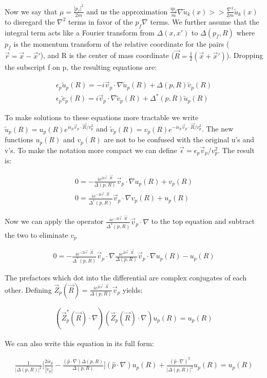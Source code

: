 \documentclass{article}
\begin{document}
Now we say that $\mu=\frac{|p_f|^2}{2m}$ and us the approximation $\frac{ip_f}{m}\nabla\tilde{u}_k(x)>>\frac{\nabla^2}{2m}\tilde{u}_k(x)$ to disregard the $\nabla^2$ terms in favor of the $p_f\nabla$ terms. We further assume that the integral term acts like a Fourier transform from $\Delta(x,x')$ to $\Delta(p_f,R)$ where $p_f$ is the momentum transform of the relative coordinate for the pairs ($\vec{r}=\vec{x}-\vec{x}'$), and R is the center of mass coordinate ($\vec{R}=\frac{1}{2}(\vec{x}+\vec{x}')$). Dropping the subscript f on p, the resulting equations are:

\begin{align*}
\epsilon_p\tilde{u}_p(R)=-i\vec{v}_p\cdot\nabla\tilde{u}_p(R)+\Delta(p,R)\tilde{v}_p(R) \\
\epsilon_p\tilde{v}_p(R)=i\vec{v}_p\cdot\nabla\tilde{v}_p(R)+\Delta^*(p,R)\tilde{u}_p(R)
\end{align*}

To make solutions to these equations more tractable we write $\tilde{u}_p(R)=u_p(R) e^{i\epsilon_p\vec{v}_p\cdot\vec{R}/v_p^2}$ and $\tilde{v}_p(R)=v_p(R) e^{-i\epsilon_p\vec{v}_p\cdot\vec{R}/v_p^2}$. The new functions $u_p(R)$ and $v_p(R)$ are not to be confused with the original u's and v's. To make the notation more compact we can define $\vec{\epsilon}=\epsilon_p\vec{v}_p/v_p^2$. The result is:

\begin{align*}
0=-\frac{ie^{2i\vec{\epsilon}\cdot \vec{R}}}{\Delta(p,R)}\vec{v}_p\cdot\nabla u_p(R)+v_p(R)\\
0=\frac{ie^{-2i\vec{\epsilon}\cdot \vec{R}}}{\Delta^*(p,R)}\vec{v}_p\cdot\nabla v_p(R)+u_p(R)
\end{align*}

Now we can apply the operator $\frac{ie^{-2i\vec{\epsilon}\cdot \vec{R}}}{\Delta^*(p,R)}\vec{v}_p\cdot\nabla$ to the top equation and subtract the two to eliminate $v_p$

\begin{align*}
0=-\frac{ie^{-2i\vec{\epsilon}\cdot \vec{R}}}{\Delta^*(p,R)}\vec{v}_p\cdot\nabla\frac{ie^{2i\vec{\epsilon}\cdot \vec{R}}}{\Delta(p,R)}\vec{v}_p\cdot\nabla u_p(R)-u_p(R)
\end{align*}

The prefactors which dot into the differential are complex conjugates of each other. Defining $\vec{Z}_p(\vec{R})=\frac{ie^{2i\vec{\epsilon}\cdot \vec{R}}}{\Delta(p,R)}\vec{v}_p$ yields:

\begin{align*}
(\vec{Z}_p^*(\vec{R})\cdot\nabla)(\vec{Z}_p(\vec{R})\cdot\nabla) u_p(R)=u_p(R)
\end{align*}

We can also write this equation in its full form:

\begin{align*}
\frac{1}{|\Delta(p,R)|^2}\bigg[\frac{2i\epsilon_p}{|v_p|}-\frac{(\hat{p}\cdot\nabla)\Delta(p,R)}{\Delta(p,R)}\bigg](\hat{p}\cdot\nabla)u_p(R)+\frac{(\hat{p}\cdot\nabla)^2}{|\Delta(p,R)|^2}u_p(R)=u_p(R)
\end{align*}
\end{document}
